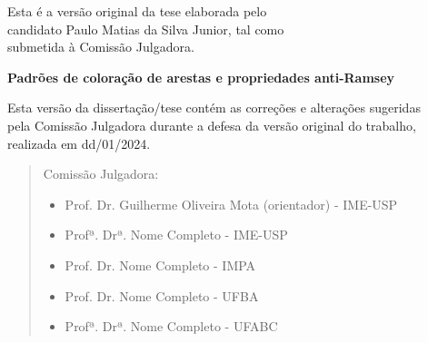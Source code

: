 \documentclass[12pt,a4paper]{book}
\begin{document}
    \vskip 2cm

    \begin{flushright}
	Esta é a versão original da tese elaborada pelo\\
	candidato Paulo Matias da Silva Junior, tal como \\
	submetida à Comissão Julgadora.
    \end{flushright}

\pagebreak

%
%
%
%
\newpage
\thispagestyle{empty}
    \begin{center}
        \vspace*{2.3 cm}
        \textbf{\Large{Padrões de coloração de arestas e propriedades anti-Ramsey }}\\
        \vspace*{2 cm}
    \end{center}

    \vskip 2cm

    \begin{flushright}
	Esta versão da dissertação/tese contém as correções e alterações sugeridas\\
	pela Comissão Julgadora durante a defesa da versão original do trabalho,\\
	realizada em dd/01/2024.

    \vskip 2cm

    \end{flushright}
    \vskip 4.2cm

    \begin{quote}
    \noindent Comissão Julgadora:
    
    \begin{itemize}
		\item Prof. Dr. Guilherme Oliveira Mota (orientador) - IME-USP 
		\item Profª. Drª. Nome Completo - IME-USP %
		\item Prof. Dr. Nome Completo - IMPA %
         \item Prof. Dr. Nome Completo - UFBA %
        \item Profª. Drª. Nome Completo - UFABC %
    \end{itemize}
      
    \end{quote}
\pagebreak
\end{document}
